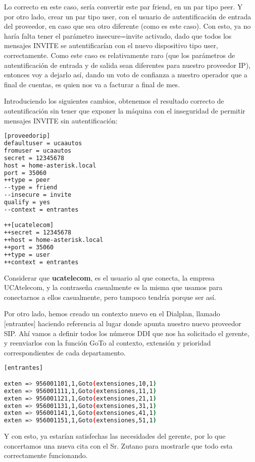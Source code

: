 Lo correcto en este caso, sería convertir este par friend, en un par tipo peer. Y por otro lado, crear un par tipo user, con el usuario de autentificación de entrada del proveedor, en caso que sea otro diferente (como es este caso). Con esto, ya no haría falta tener el parámetro insecure=invite activado, dado que todos los mensajes INVITE se autentificarían con el nuevo dispositivo tipo user, correctamente. Como este caso es relativamente raro (que los parámetros de autentificación de entrada y de salida sean diferentes para nuestro proveedor IP), entonces voy a dejarlo así, dando un voto de confianza a nuestro operador que a final de cuentas, es quien nos va a facturar a final de mes.

Introduciendo los siguientes cambios, obtenemos el resultado correcto de autentificación sin tener que exponer la máquina con el inseguridad de permitir mensajes INVITE sin autentificación:

\begin{lstlisting}[language=bash,title={/etc/asterisk/sip.conf}]
[proveedorip]
defaultuser = ucaautos
fromuser = ucaautos
secret = 12345678
host = home-asterisk.local
port = 35060
++type = peer
--type = friend
--insecure = invite
qualify = yes
--context = entrantes

++[ucatelecom]
++secret = 12345678
++host = home-asterisk.local
++port = 35060
++type = user
++context = entrantes
\end{lstlisting}

Considerar que \textbf{ucatelecom}, es el usuario al que conecta, la empresa UCAtelecom, y la contraseña casualmente es la misma que usamos para conectarnos a ellos casualmente, pero tampoco tendría porque ser así.

Por otro lado, hemos creado un contexto nuevo en el Dialplan, llamado [entrantes] haciendo referencia al lugar donde apunta nuestro nuevo proveedor SIP. Ahí vamos a definir todos los números DDI que nos ha solicitado el gerente, y reenviarlos con la función GoTo al contexto, extensión y prioridad correspondientes de cada departamento.

\begin{lstlisting}[language=bash,title={/etc/asterisk/extensions.conf}]
[entrantes]

exten => 956001101,1,Goto(extensiones,10,1)
exten => 956001111,1,Goto(extensiones,11,1)
exten => 956001121,1,Goto(extensiones,21,1)
exten => 956001131,1,Goto(extensiones,31,1)
exten => 956001141,1,Goto(extensiones,41,1)
exten => 956001151,1,Goto(extensiones,51,1)
\end{lstlisting}

Y con esto, ya estarían satisfechas las necesidades del gerente, por lo que concertamos una nueva cita con el Sr. Zutano para mostrarle que todo esta correctamente funcionando.
